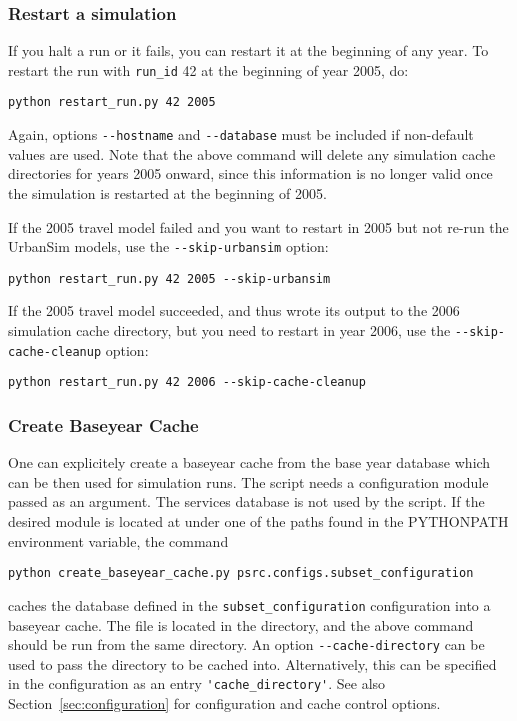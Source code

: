\subsubsection{Restart a simulation}
If you halt a run or it fails, you can restart it at the beginning of any year.
To restart the run with \verb|run_id| 42 at the beginning of year 2005, do:

\begin{verbatim}
python restart_run.py 42 2005
\end{verbatim}
Again, options \verb|--hostname| and \verb|--database| must be included
if non-default values are used.  Note that the above command will delete any
simulation cache \simulationcacheindex directories for years 2005 onward, since
this information is no longer valid once the simulation is restarted at the
beginning of 2005.

If the 2005 travel model failed and you want to restart in 2005 but not re-run
the UrbanSim models, use the \verb|--skip-urbansim| option:

\begin{verbatim}
python restart_run.py 42 2005 --skip-urbansim
\end{verbatim}

If the 2005 travel model succeeded, and thus wrote its output to the 2006
simulation cache \simulationcacheindex directory, but you need to restart in year 2006, use the
\verb|--skip-cache-cleanup| option:

\begin{verbatim}
python restart_run.py 42 2006 --skip-cache-cleanup
\end{verbatim}

\subsubsection{Create Baseyear Cache}
\label{sec:run-manager-baseyearcache}
%
One can explicitely create a baseyear
cache from
the base year database which can be then used for simulation runs. The script
needs a configuration module passed as an argument. The services database is
not used by the script. If the desired module is located at
 under one of the paths found in the
PYTHONPATH environment variable, the command

\begin{verbatim}
python create_baseyear_cache.py psrc.configs.subset_configuration
\end{verbatim}
caches the database defined in the \verb|subset_configuration| configuration into a baseyear
cache. The  file is located in
the  directory, and the above command should be
run from the same directory. An option \verb|--cache-directory|
can be used to pass the directory to be cached into. Alternatively, this can be
specified in the configuration as an entry \verb|'cache_directory'|. See also
Section~\ref{sec:configuration} for configuration and cache control options.


